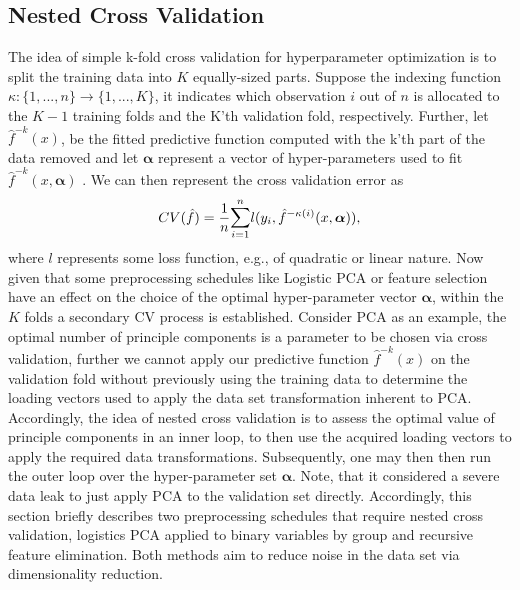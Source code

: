 \documentclass[a4paper,12pt, headsepline]{scrartcl}
\numberwithin{equation}{section}
\begin{document}
\subsection{Nested Cross Validation}\label{subsec:nest}
The idea of simple k-fold cross validation for hyperparameter optimization is to split the training data into $K$ equally-sized parts. Suppose the indexing function $\kappa: \{1, ..., n\} \rightarrow \{1, ..., K\}$, it indicates which observation $i$ out of $n$ is allocated to the $K - 1$ training folds and the K'th validation fold, respectively. Further, let $\hat f^{-k}(x)$, be the fitted predictive function computed with the k'th part of the data removed and let $\bm \alpha$ represent a vector of hyper-parameters used to fit $\hat f^{-k}(x, \bm{\alpha})$ \citep{hastie09}. We can then represent the cross validation error as
\begin{gather*}
	CV(\hat f) = \frac{1}{n} \mathlarger{\sum}\limits_{i = 1}^{n} l(y_i, \hat f^{-\kappa(i)}(x, \bm \alpha)),
\end{gather*}
where $l$ represents some loss function, e.g., of quadratic or linear nature.
Now given that some preprocessing schedules like Logistic PCA or feature selection have an effect on the choice of the optimal hyper-parameter vector $\bm \alpha$, within the $K$ folds a secondary CV process is established. Consider PCA as an example, the optimal number of principle components is a parameter to be chosen via cross validation, further we cannot apply our predictive function $\hat f^{-k}(x)$ on the validation fold without previously using the training data to determine the loading vectors used to apply the data set transformation inherent to PCA. Accordingly, the idea of nested cross validation is to assess the optimal value of principle components in an inner loop, to then use the acquired loading vectors to apply the required data transformations. Subsequently, one may then then run the outer loop over the hyper-parameter set $\bm \alpha$. Note, that it considered a severe data leak to just apply PCA to the validation set directly. Accordingly, this section briefly describes two preprocessing schedules that require nested cross validation, logistics PCA applied to binary variables by group and recursive feature elimination. Both methods aim to reduce noise in the data set via dimensionality reduction.
\end{document}
